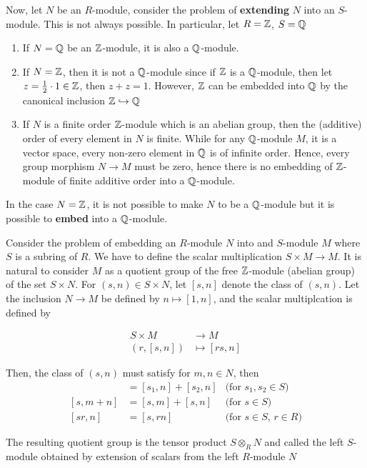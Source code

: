 Now, let  $N$ be an $R$-module, consider the problem of \textbf{extending} $N$ into an $S$-module. This is not always possible. In particular, let $R = \mathbb{Z}$, $S = \mathbb{Q}$
\begin{enumerate}
	\item If $N = \mathbb{Q}$ be an $\mathbb{Z}$-module, it is also a $\mathbb{Q}$-module.
	
	\item If $N = \mathbb{Z}$, then it is not a $\mathbb{Q}$-module since if $\mathbb{Z}$ is a $\mathbb{Q}$-module, then let $z = \frac{1}{2} \cdot 1 \in \mathbb{Z}$, then $z + z = 1$. However, $\mathbb{Z}$ can be embedded into $\mathbb{Q}$ by the canonical inclusion $\mathbb{Z} \hookrightarrow \mathbb{Q}$
	
	\item If $N$ is a finite order $\mathbb{Z}$-module which is an abelian group, then the (additive) order of every element in $N$ is finite. While for any $\mathbb{Q}$-module $M$, it is a vector space, every non-zero element in $\mathbb{Q}$ is of infinite order. Hence, every group morphism $N \to M$ must be zero, hence there is no embedding of $\mathbb{Z}$-module of finite additive order into a $\mathbb{Q}$-module.
\end{enumerate}

In the case $N = \mathbb{Z}$, it is not possible to make $N$ to be a $\mathbb{Q}$-module but it is possible to \textbf{embed} into a $\mathbb{Q}$-module. 

Consider the problem of embedding an $R$-module $N$ into and $S$-module $M$ where $S$ is a subring of $R$. We have to define the scalar multiplication $S \times M \to M$. It is natural to consider $M$ as a quotient group of the free $\mathbb{Z}$-module (abelian group) of the set $S \times N$. For $(s, n) \in S \times N$, let $[s, n]$ denote the class of $(s, n)$. Let the inclusion $N \to M$ be defined by $n \mapsto [1, n]$, and the scalar multiplcation is defined by

\begin{align*}
	S \times M &\to M\\
	(r, [s, n]) &\mapsto [rs, n]
\end{align*}

Then, the class of $(s, n)$ must satisfy for $m, n \in N$, then
\begin{align*}
	[s_1 + s_2, n] &= [s_1, n] + [s_2, n] &\text{(for $s_1, s_2 \in S$)} \\
	[s, m + n] &= [s, m] + [s, n] &\text{(for $s \in S$)} \\
	[sr, n] &= [s, rn] &\text{(for $s \in S$, $r \in R$)}
\end{align*}

The resulting quotient group is the tensor product $S \otimes_R N$ and called the left $S$-module obtained by extension of scalars from the left $R$-module $N$

